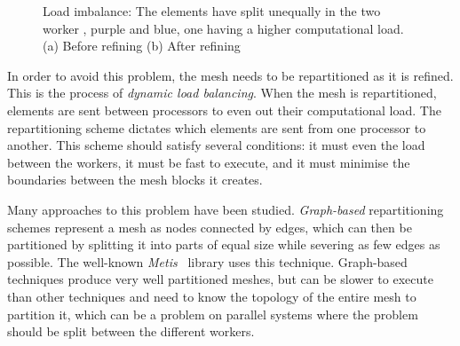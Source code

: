 \begin{figure}[H]
	\centering
	\hfill
	\caption{Load imbalance: The elements have split unequally in the two worker , purple and blue, one having a higher computational load. (a) Before refining (b) After refining}\label{fig:intro_load_balancing}
\end{figure}

In order to avoid this problem, the mesh needs to be repartitioned as it is refined. This is the
process of \textit{dynamic load balancing}. When the mesh is repartitioned, elements are sent
between processors to even out their computational load. The repartitioning scheme dictates which
elements are sent from one processor to another. This scheme should satisfy several conditions: it
must even the load between the workers, it must be fast to execute, and it must minimise the
boundaries between the mesh blocks it creates. 

Many approaches to this problem have been studied. \textit{Graph-based} repartitioning schemes
represent a mesh as nodes connected by edges, which can then be partitioned by splitting it into
parts of equal size while severing as few edges as possible. The well-known
\textit{Metis}~\cite{Karypis1998} library uses this technique. Graph-based techniques produce very
well partitioned meshes, but can be slower to execute than other techniques and need to know the
topology of the entire mesh to partition it, which can be a problem on parallel systems where the
problem should be split between the different workers.


